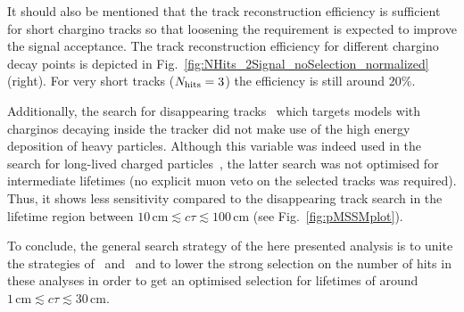 It should also be mentioned that the track reconstruction efficiency is sufficient for short chargino tracks so that loosening the \nhits requirement is expected to improve the signal acceptance. 
The track reconstruction efficiency for different chargino decay points is depicted in Fig.~\ref{fig:NHits_2Signal_noSelection_normalized} (right).
For very short tracks ($N_{\text{hits}}=3$) the efficiency is still around 20\%.

Additionally, the search for disappearing tracks~\cite{bib:CMS:DT_8TeV} which targets models with charginos decaying inside the tracker did not make use of the high energy deposition of heavy particles. 
Although this variable was indeed used in the search for long-lived charged particles~\cite{bib:CMS:HSCP_8TeV}, the latter search was not optimised for intermediate lifetimes (\eg no explicit muon veto on the selected tracks was required). 
Thus, it shows less sensitivity compared to the disappearing track search in the lifetime region between $10\,\text{cm} \lesssim c\tau \lesssim 100\,\text{cm}$ (see Fig.~\ref{fig:pMSSMplot}).

To conclude, the general search strategy of the here presented analysis is to unite the strategies of~\cite{bib:CMS:HSCP_8TeV} and~\cite{bib:CMS:DT_8TeV} and to lower the strong selection on the number of hits in these analyses in order to get an optimised selection for lifetimes of around $1\,\text{cm} \lesssim c\tau \lesssim  30\,\text{cm}$.

